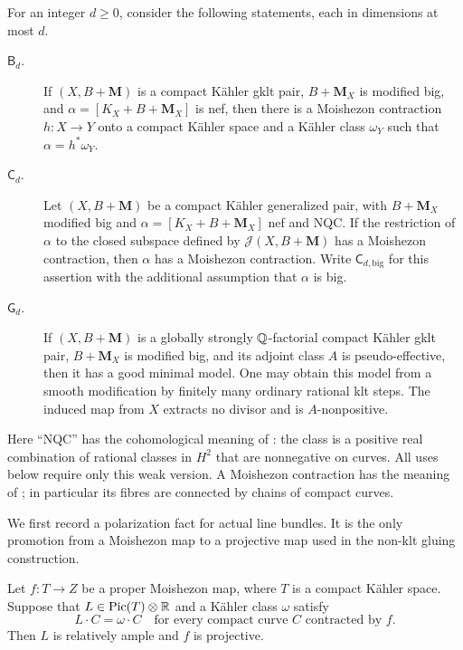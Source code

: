 For an integer $d\geq0$, consider the following statements, each in
dimensions at most $d$.
\begin{description}
\item[$\mathsf B_d$.]
If $(X,B+\mathbf M)$ is a compact K\"ahler gklt pair,
$B+\mathbf M_X$ is modified big, and
$\alpha=[K_X+B+\mathbf M_X]$ is nef, then there is a Moishezon
contraction $h:X\to Y$ onto a compact K\"ahler space and a K\"ahler
class $\omega_Y$ such that $\alpha=h^*\omega_Y$.
\item[$\mathsf C_d$.]
Let $(X,B+\mathbf M)$ be a compact K\"ahler generalized pair, with
$B+\mathbf M_X$ modified big and
$\alpha=[K_X+B+\mathbf M_X]$ nef and NQC. If the restriction of
$\alpha$ to the closed subspace defined by
$\mathcal J(X,B+\mathbf M)$ has a Moishezon contraction, then
$\alpha$ has a Moishezon contraction.
Write $\mathsf C_{d,\mathrm{big}}$ for this assertion with the
additional assumption that $\alpha$ is big.
\item[$\mathsf G_d$.]
If $(X,B+\mathbf M)$ is a globally strongly $\mathbb Q$-factorial compact
K\"ahler gklt pair, $B+\mathbf M_X$ is modified big, and its adjoint
class $A$ is pseudo-effective, then it has a good minimal model.
One may obtain this model from a smooth modification by finitely many
ordinary rational klt steps. The induced map from $X$ extracts no
divisor and is $A$-nonpositive.
\end{description}
Here ``NQC'' has the cohomological meaning of
\cite[Definition~2.43]{HX2026}: the class is a positive real
combination of rational classes in $H^2$ that are nonnegative on
curves. All uses below require only this weak version. A Moishezon
contraction has the meaning of \cite[Definition~2.32]{HX2026}; in
particular its fibres are connected by chains of compact curves.

We first record a polarization fact for actual line bundles. It is
the only promotion from a Moishezon map to a projective map used in
the non-klt gluing construction.

\begin{lemma}
\label{repair:lem:actual-line-polarization}
Let $f:T\to Z$ be a proper Moishezon map, where $T$ is a compact
K\"ahler space. Suppose that $L\in\operatorname{Pic}(T)\otimes\mathbb R$
and a K\"ahler class $\omega$ satisfy
\[
 L\cdot C=\omega\cdot C
 \quad\text{for every compact curve $C$ contracted by $f$.}
\]
Then $L$ is relatively ample and $f$ is projective.
\end{lemma}

